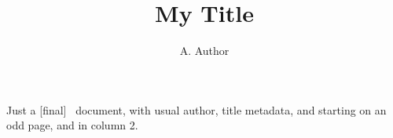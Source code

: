 \documentclass[final,secondcolstart]{ltugboat}
\author{A. Author}
\title{My Title}
\begin{document}
\maketitle
Just a [final] \TUB\ document, with usual author, title metadata,
and starting on an odd page, and in column 2.
\end{document}
